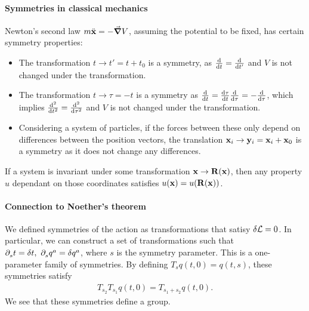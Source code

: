 \paragraph{Symmetries in classical mechanics}

Newton's second law $m\ddot{\vb{x}} = -\grad{V}$, assuming the potential to be fixed, has certain symmetry properties:
\begin{itemize}
	\item The transformation $t\to t' = t + t_{0}$ is a symmetry, as $\dv{t} = \dv{t'}$ and $V$ is not changed under the transformation.
	\item The transformation $t\to\tau = -t$ is a symmetry as $\dv{t} = \dv{\tau}{t}\dv{\tau} = -\dv{\tau}$, which implies $\dv[2]{t} = \dv[2]{\tau}$ and $V$ is not changed under the transformation.
	\item Considering a system of particles, if the forces between these only depend on differences between the position vectors, the translation $\vb{x}_{i}\to\vb{y}_{i} = \vb{x}_{i} + \vb{x}_{0}$ is a symmetry as it does not change any differences.
\end{itemize}

If a system is invariant under some transformation $\vb{x}\to\vb{R}(\vb{x})$, then any property $u$ dependant on those coordinates satisfies $u(\vb{x}) = u(\vb{R}(\vb{x}))$.

\paragraph{Connection to Noether's theorem}
We defined symmetries of the action as transformations that satisy $\delta \mathcal{L} = 0$. In particular, we can construct a set of transformations such that $\partial^{}_{s}t = \delta t,\ \partial^{}_{s}q^{a} = \delta q^{a}$, where $s$ is the symmetry parameter. This is a one-parameter family of symmetries. By defining $T_{s}q(t, 0) = q(t, s)$, these symmetries satisfy
\begin{align*}
	T_{s_{2}}T_{s_{1}}q(t, 0) = T_{s_{1} + s_{2}}q(t, 0).
\end{align*}
We see that these symmetries define a group.


